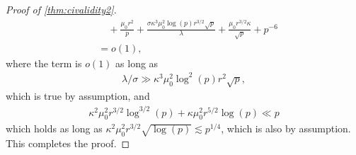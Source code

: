 \documentclass[10pt]{article}
\newcommand{\0}{{\mathbf{0}}}
\newcommand{\1}{{\mathbf{1}}}
\begin{document}
\begin{proof}[Proof of \cref{thm:civalidity2}]
\begin{align*}
    &\quad +\frac{\mu_0 r^2}{p} + \frac{\sigma \kappa^3 \mu_0^2 \log(p) r^{3/2} \sqrt{p}}{\lambda} + \frac{\mu_0 r^{3/2} \kappa}{\sqrt{p}} + p^{-6} \\
    &= o(1),
\end{align*}
where the term is $o(1)$ as long as
\begin{align*}
    \lambda/\sigma \gg \kappa^3 \mu_0^2 \log^2(p) r^2 \sqrt{p},
\end{align*}
which is true by assumption, and 
\begin{align*}
    \kappa^2 \mu_0^2 r^{3/2} \log^{3/2}(p) + \kappa \mu_0^2 r^{5/2} \log(p) \ll p
\end{align*}
which holds as long as $\kappa^2 \mu_0^2 r^{3/2} \sqrt{\log(p)} \lesssim p^{1/4}$, which is also by assumption. This completes the proof. 
\end{proof}
\end{document}
